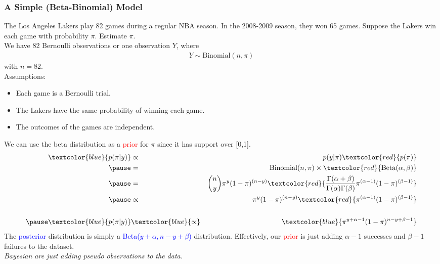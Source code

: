 \documentclass[handout]{beamer}
\begin{document}
\begin{frame}
\frametitle{A Simple (Beta-Binomial) Model}
\pause
The Los Angeles Lakers play 82 games during a regular NBA season.
\pause In the 2008-2009 season, they won 65 games.  \pause Suppose the Lakers win each
game with probability $\pi$.  \pause Estimate $\pi$. \\
\pause
\bigskip
We have 82 Bernoulli observations or one observation $Y$, where
\begin{eqnarray*}
Y \sim \mathrm{Binomial}(n, \pi)
\end{eqnarray*}
with $n=82$.\\
\bigskip
\pause
Assumptions:
\pause
\begin{itemize}
\item Each game is a Bernoulli trial.
\pause
\item The Lakers have the same probability of winning each game.  
\pause
\item The outcomes of the games are independent.
\end{itemize}
\end{frame}

\begin{frame}
We can use the beta distribution as a \textcolor{red}{prior} for
$\pi$ since it has support over [0,1].
\pause
\footnotesize
\begin{eqnarray*}
\textcolor{blue}{p(\pi | y)} &\propto& p(y | \pi) \textcolor{red}{p(\pi)} \\
\pause
&=& \mathrm{Binomial}(n, \pi) \times
\textcolor{red}{\mathrm{Beta}(\alpha, \beta)}\\
\pause
&=& \binom{n}{y} \pi^y (1 - \pi)^{(n-y)} \textcolor{red}{\frac{\Gamma (\alpha + \beta)}{\Gamma (\alpha)
\Gamma (\beta)} \pi^{(\alpha - 1)} (1 - \pi)^{(\beta-1)}}\\
\pause
&\propto& \pi^y (1 - \pi)^{(n-y)} \textcolor{red}{\pi^{(\alpha - 1)}
(1 - \pi)^{(\beta-1)}} \\\\
\pause
\textcolor{blue}{p(\pi | y)} &\textcolor{blue}{\propto}& \textcolor{blue}{\pi^{y+\alpha-1} (1-\pi)^{n-y+\beta-1}}
\end{eqnarray*}
\normalsize
\pause
The \textcolor{blue}{posterior} distribution is simply a
\textcolor{blue}{Beta($y+\alpha, n-y+\beta$)} distribution. \pause
Effectively, our \textcolor{red}{prior} is just adding $\alpha-1$
successes and $\beta - 1$ failures to the dataset.\\
\bigskip
\pause
{\it Bayesian  are just adding pseudo observations to the data.}
\end{frame}
\end{document}
